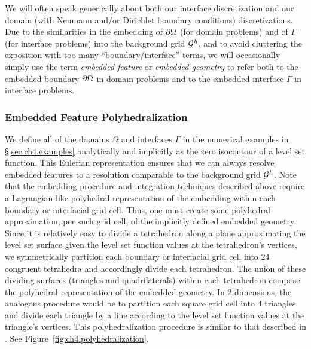 We will often speak generically about both our interface discretization and our domain (with Neumann and/or Dirichlet boundary conditions) discretizations. Due to the similarities in the embedding of $\partial\Omega$ (for domain problems) and of $\Gamma$ (for interface problems) into the background grid $\mathcal{G}^h$, and to avoid cluttering the exposition with too many ``boundary/interface'' terms, we will occasionally simply use the term \emph{embedded feature} or \emph{embedded geometry} to refer both to the embedded boundary $\partial\Omega$ in domain problems and to the embedded interface $\Gamma$ in interface problems.

\subsubsection{Embedded Feature Polyhedralization} \label{subsubsec:ch4.polyhedralization}

We define all of the domains $\Omega$ and interfaces $\Gamma$ in the numerical examples in \S\ref{sec:ch4.examples} analytically and implicitly as the zero isocontour of a level set function. This Eulerian representation ensures that we can always resolve embedded features to a resolution comparable to the background grid $\mathcal{G}^h$. Note that the embedding procedure and integration techniques described above require a Lagrangian-like polyhedral representation of the embedding within each boundary or interfacial grid cell. Thus, one must create some polyhedral approximation, per such grid cell, of the implicitly defined embedded geometry. Since it is relatively easy to divide a tetrahedron along a plane approximating the level set surface given the level set function values at the tetrahedron's vertices, we symmetrically partition each boundary or interfacial grid cell into $24$ congruent tetrahedra and accordingly divide each tetrahedron. The union of these dividing surfaces (triangles and quadrilaterals) within each tetrahedron compose the polyhedral representation of the embedded geometry. In $2$ dimensions, the analogous procedure would be to partition each square grid cell into $4$ triangles and divide each triangle by a line according to the level set function values at the triangle's vertices. This polyhedralization procedure is similar to that described in \cite{Min.Chohong07}. See Figure~\ref{fig:ch4.polyhedralization}.

